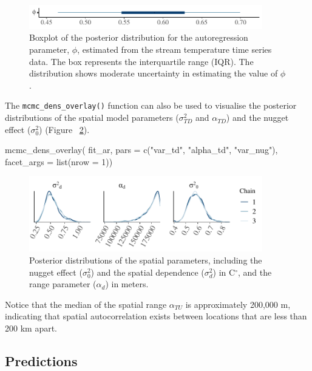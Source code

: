 \begin{figure}[htbp]
  \centering
   \includegraphics[width=4.0in]{./Figs_Pay/phi_boxplots.pdf}
  \caption{
  Boxplot of the posterior distribution for the autoregression parameter, $\phi$, estimated from the stream temperature time series data. The box represents the interquartile range (IQR). The distribution shows moderate uncertainty in estimating the value of $\phi$.
  }
  \label{figure:phi_boxplots}
\end{figure}


The \texttt{mcmc\_dens\_overlay()} function can also be used to visualise the posterior distributions of the spatial model parameters ($\sigma^2_{TD}$ and $\alpha_{TD}$) and the nugget effect ($\sigma^2_{0}$) (Figure ~\ref{figure:varalphanug}). 

\begin{example}
mcmc_dens_overlay(
  fit_ar,
  pars = c("var_td", "alpha_td", "var_nug"),
  facet_args = list(nrow = 1))
\end{example}

\begin{figure}[htbp]
  \centering
   \includegraphics[width=4.0in]{./Figs_Pay/var_alpha_nug.pdf}
  \caption{
  Posterior distributions of the spatial parameters, including the nugget effect ($\sigma^{2}_0$) and the spatial dependence ($\sigma^{2}_d$) in C$^{\circ}$, and the range parameter ($\alpha_d$) in meters.
  }
  \label{figure:varalphanug}
\end{figure}

Notice that the median of the spatial range $\alpha_{TU}$ is approximately 200,000 m, indicating that spatial autocorrelation exists between locations that are less than 200 km apart.





\subsection{Predictions}


